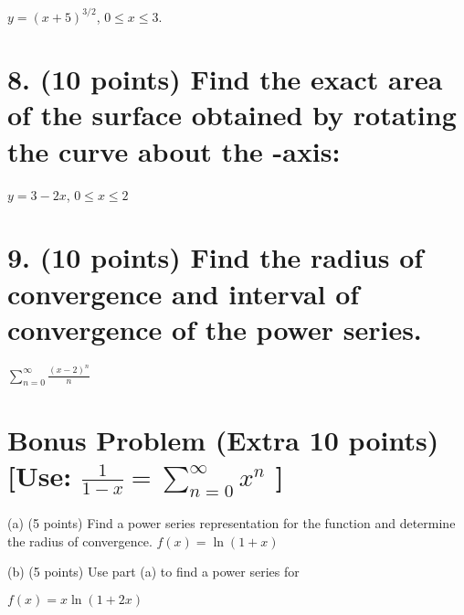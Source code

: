 \documentclass[12pt]{article}
\begin{document}
$y=(x+5)^{3/2}$, $0\le x\le3$.

\newpage

\section*{8. (10 points) Find the exact area of the surface obtained by rotating the curve about the  -axis:}

$y=3-2x$, $0\le x\le2$ 

\newpage

\section*{9. (10 points) Find the radius of convergence and interval of convergence of the power series.}
$\sum_{n=0}^{\infty} \frac{(x - 2)^n}{n}$ 

\newpage

\section*{Bonus Problem (Extra 10 points) [Use: $\frac{1}{1 - x} = \sum_{n=0}^{\infty} x^n$ ]}

(a) (5 points) Find a power series representation for the function and determine the radius of convergence. 
$f(x) = \ln(1 + x)$ 

(b) (5 points) Use part (a) to find a power series for

$f(x) = x \ln(1 + 2x)$
\end{document}
